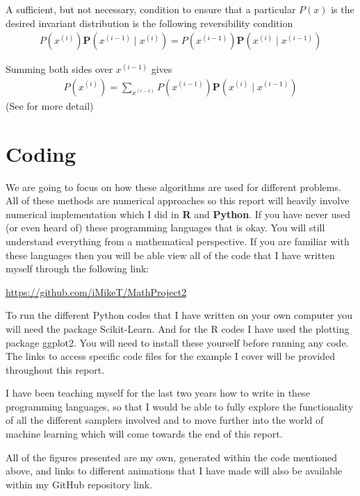 \documentclass[12pt,twoside]{report}   %
\newcommand{\bb}{\textbf}
\begin{document}
A sufficient, but not necessary, condition to ensure that a particular $P(x)$ is the desired
invariant distribution is the following reversibility condition
\begin{align}\label{reversibility}
P\left(x^{(i)}\right)\textbf{P}\left(x^{(i-1)}\mid x^{(i)}\right) = P\left(x^{(i-1)}\right)\textbf{P}\left(x^{(i)}\mid x^{(i-1)}\right)
\end{align}

Summing both sides over $x^{(i-1)}$ gives
\begin{align*}
P\left(x^{(i)}\right) = \sum_{x^{(i-1)}}P\left(x^{(i-1)}\right)\textbf{P}\left(x^{(i)}\mid x^{(i-1)}\right)
\end{align*}
(See \cite{5} for more detail)

\section{Coding}\label{coding}
\vspace{-0.4in}
\underline{\hspace{6.2in}}
\vspace{-0.1in}

We are going to focus on how these algorithms are used for different problems. All of these methods are numerical approaches so this report will heavily involve numerical implementation which I did in \bb{R} and \bb{Python}. If you have never used (or even heard of) these programming languages that is okay. You will still understand everything from a mathematical perspective. If you are familiar with these languages then you will be able view all of the code that I have written myself through the following link:
\begin{center}
\url{https://github.com/iMikeT/MathProject2}
\end{center}
To run the different Python codes that I have written on your own computer you will need the package Scikit-Learn. And for the R codes I have used the plotting package ggplot2. You will need to install these yourself before running any code. The links to access specific code files for the example I cover will be provided throughout this report.

I have been teaching myself for the last two years how to write in these programming languages, so that I would be able to fully explore the functionality of all the different samplers involved and to move further into the world of machine learning which will come towards the end of this report.

All of the figures presented are my own, generated within the code mentioned above, and links to different animations that I have made will also be available within my GitHub repository link.
\end{document}
